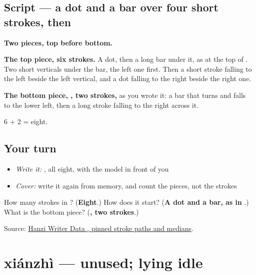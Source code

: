 \subsection*{Script — a dot and a bar over four short strokes, then }

\begin{quote}
\end{quote}

\textbf{Two pieces, top before bottom.}

\textbf{The top piece, six strokes.} A dot, then a long bar under it, as at the top of . Two short verticals under the bar, the left one first. Then a short stroke falling to the left beside the left vertical, and a dot falling to the right beside the right one.

\textbf{The bottom piece, , two strokes,} as you wrote it: a bar that turns and falls to the lower left, then a long stroke falling to the right across it.

6 + 2 = eight.

\subsection*{Your turn}
\begin{itemize}
\raggedright
  \item \emph{Write it:} , all eight, with the model in front of you
  \item \emph{Cover:} write it again from memory, and count the pieces, not the strokes
\end{itemize}

\begin{tcolorbox}[breakable,colback=teal!4,colframe=teal!35!black,title={Before you move on}]
How many strokes in ? (\textbf{Eight}.) How does it start? (\textbf{A dot and a bar, as in }.) What is the bottom piece? (\textbf{, two strokes}.)

Source: \href{https://raw.githubusercontent.com/chanind/hanzi-writer-data/68d10a4b21150cae5e1ebbd223eed289cf32d90c/data/\%E5\%8F\%98.json}{Hanzi Writer Data , pinned stroke paths and medians}.
\end{tcolorbox}
\section[xiánzhì]{xiánzhì — unused; lying idle}

